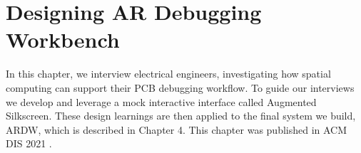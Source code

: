 \documentclass [11pt, proquest] {uwthesis}[2020/02/24]
\newcommand{\ASname}{Augmented Silkscreen}
\newcommand{\ARDWname}{ARDW}
\begin{document}
 
 
\chapter{Designing AR Debugging Workbench}

In this chapter, we interview electrical engineers, investigating how spatial computing can support their PCB debugging workflow. To guide our interviews we develop and leverage a mock interactive interface called \ASname. These design learnings are then applied to the final system we build, \ARDWname, which is described in Chapter 4. This chapter was published in ACM DIS 2021 \cite{Chatterjee2021AugmentedBoards}. 
\end{document}
